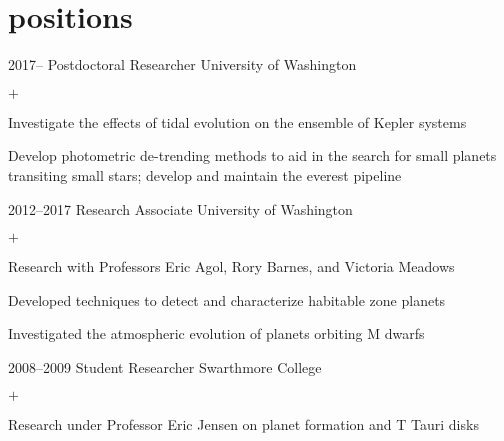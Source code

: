\documentclass[]{luger-cv} %
\begin{document}
\section{positions}

\begin{entrylist}


\entry
{2017--}
{Postdoctoral Researcher}
{University of Washington}
{%
\vspace{-1em}
\begin{list}{$+$}{\cvlist}
\item Investigate the effects of tidal evolution on the ensemble of Kepler systems
\item Develop photometric de-trending methods to aid in the search for small
      planets transiting small stars; develop and maintain the everest pipeline
\end{list}
}


\entry
{2012--2017}
{Research Associate}
{University of Washington}
{%
\vspace{-1em}
\begin{list}{$+$}{\cvlist}
\item Research with Professors Eric Agol, Rory Barnes, and Victoria Meadows
\item Developed techniques to detect and characterize habitable
zone planets
\item Investigated the atmospheric evolution of planets orbiting M dwarfs
\end{list}
}


\entry
{2008--2009}
{Student Researcher}
{Swarthmore College}
{%
\vspace{-1em}
\begin{list}{$+$}{\cvlist}
\item Research under Professor Eric Jensen on planet formation and T Tauri disks
\end{list}
}


\end{entrylist}

\end{document}
